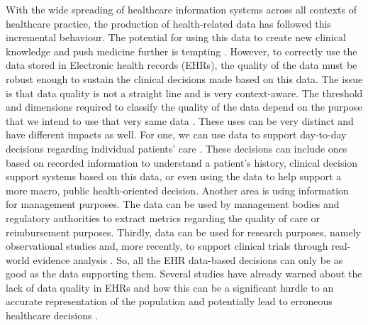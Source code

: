 With the wide spreading of healthcare information systems across all contexts of healthcare practice, the production of health-related data has followed this incremental behaviour. The potential for using this data to create new clinical knowledge and push medicine further is tempting \cite{martin-sanchezBigDataMedicine2014}.
However, to correctly use the data stored in Electronic health records (EHRs), the quality of the data must be robust enough to sustain the clinical decisions made based on this data. The issue is that data quality is not a straight line and is very context-aware. The threshold and dimensions required to classify the quality of the data depend on the purpose that we intend to use that very same data \cite{waljiElectronicHealthRecords2019}. These uses can be very distinct and have different impacts as well. For one, we can use data to support day-to-day decisions regarding individual patients' care \cite{verheijPossibleSourcesBias2018}. These decisions can include ones based on recorded information to understand a patient's history, clinical decision support systems based on this data, or even using the data to help support a more macro, public health-oriented decision. Another area is using information for management purposes. The data can be used by management bodies and regulatory authorities to extract metrics regarding the quality of care or reimbursement purposes. Thirdly, data can be used for research purposes, namely observational studies and, more recently, to support clinical trials through real-world evidence analysis \cite{coreyAssessingQualitySurgical2020,verheijPossibleSourcesBias2018,wengClinicalDataQuality2020}. 
So, all the EHR data-based decisions can only be as good as the data supporting them. Several studies have already warned about the lack of data quality in EHRs and how this can be a significant hurdle to an accurate representation of the population and potentially lead to erroneous healthcare decisions \cite{reimerDataQualityAssessment2016a,joukesImpactElectronicPaperBased2019a,huserMultisiteEvaluationData2016,zhangUnderstandingDetectingDefects2020,kramerImpactDataQuality2021,gigantiImpactDataQuality2019}.

